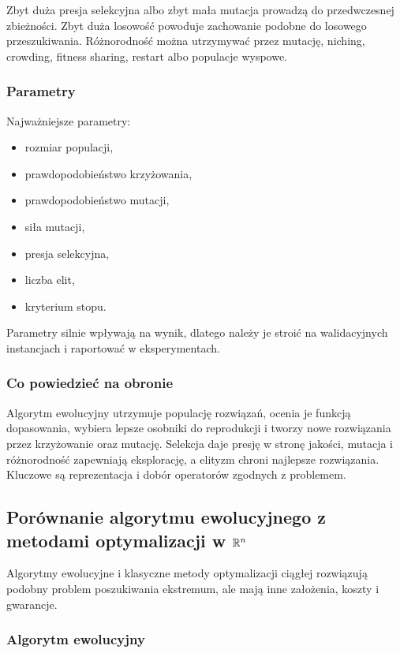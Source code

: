 Zbyt duża presja selekcyjna albo zbyt mała mutacja prowadzą do przedwczesnej zbieżności. Zbyt duża losowość powoduje zachowanie podobne do losowego przeszukiwania. Różnorodność można utrzymywać przez mutację, niching, crowding, fitness sharing, restart albo populacje wyspowe.

\subsubsection{Parametry}

Najważniejsze parametry:
\begin{itemize}
  \item rozmiar populacji,
  \item prawdopodobieństwo krzyżowania,
  \item prawdopodobieństwo mutacji,
  \item siła mutacji,
  \item presja selekcyjna,
  \item liczba elit,
  \item kryterium stopu.
\end{itemize}

Parametry silnie wpływają na wynik, dlatego należy je stroić na walidacyjnych instancjach i raportować w eksperymentach.

\subsubsection{Co powiedzieć na obronie}

Algorytm ewolucyjny utrzymuje populację rozwiązań, ocenia je funkcją dopasowania, wybiera lepsze osobniki do reprodukcji i tworzy nowe rozwiązania przez krzyżowanie oraz mutację. Selekcja daje presję w stronę jakości, mutacja i różnorodność zapewniają eksplorację, a elityzm chroni najlepsze rozwiązania. Kluczowe są reprezentacja i dobór operatorów zgodnych z problemem.

\subsection{Porównanie algorytmu ewolucyjnego z metodami optymalizacji w $\mathbb{R}^n$}

Algorytmy ewolucyjne i klasyczne metody optymalizacji ciągłej rozwiązują podobny problem poszukiwania ekstremum, ale mają inne założenia, koszty i gwarancje.

\subsubsection{Algorytm ewolucyjny}

